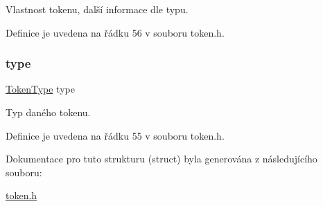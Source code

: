 Vlastnost tokenu, další informace dle typu. 



Definice je uvedena na řádku 56 v souboru token.\+h.

\mbox{\label{struct_s___token_a6e2d2148929ac137f2e2ef4091a4dc69}} 
\subsubsection{\texorpdfstring{type}{type}}
{\footnotesize\ttfamily \hyperlink{token_8h_af940495a1407c2a014c0aed83c75ff20}{Token\+Type} type}



Typ daného tokenu. 



Definice je uvedena na řádku 55 v souboru token.\+h.



Dokumentace pro tuto strukturu (struct) byla generována z následujícího souboru\+:\begin{DoxyCompactItemize}
\item 
\hyperlink{token_8h}{token.\+h}\end{DoxyCompactItemize}
